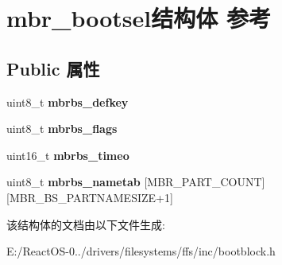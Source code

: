 \hypertarget{structmbr__bootsel}{}\section{mbr\+\_\+bootsel结构体 参考}
\label{structmbr__bootsel}
\subsection*{Public 属性}
\begin{DoxyCompactItemize}
\item 
\mbox{\label{structmbr__bootsel_a368a64af159f588931db9a802abf7319}} 
uint8\+\_\+t {\bfseries mbrbs\+\_\+defkey}
\item 
\mbox{\label{structmbr__bootsel_a02857b5dc23be9c0c8a79368f4412ff6}} 
uint8\+\_\+t {\bfseries mbrbs\+\_\+flags}
\item 
\mbox{\label{structmbr__bootsel_a85198b98b0fcfe984e056ee61dc18863}} 
uint16\+\_\+t {\bfseries mbrbs\+\_\+timeo}
\item 
\mbox{\label{structmbr__bootsel_af984758c4674c8c023cbeb26cfceff16}} 
uint8\+\_\+t {\bfseries mbrbs\+\_\+nametab} \mbox{[}M\+B\+R\+\_\+\+P\+A\+R\+T\+\_\+\+C\+O\+U\+NT\mbox{]}\mbox{[}M\+B\+R\+\_\+\+B\+S\+\_\+\+P\+A\+R\+T\+N\+A\+M\+E\+S\+I\+ZE+1\mbox{]}
\end{DoxyCompactItemize}


该结构体的文档由以下文件生成\+:\begin{DoxyCompactItemize}
\item 
E\+:/\+React\+O\+S-\/0../drivers/filesystems/ffs/inc/bootblock.\+h\end{DoxyCompactItemize}
